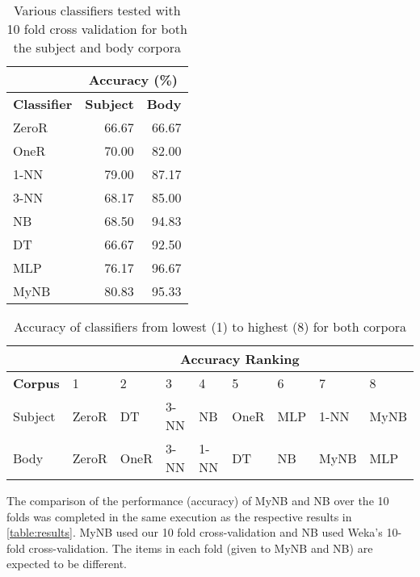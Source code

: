 \documentclass[10pt, a4paper]{article}
\begin{document}
\begin{table}[H]
\centering
\caption{Various classifiers tested with 10 fold cross validation for both the subject and body corpora}
\begin{tabular}{@{}lrr@{}}
\toprule
& \multicolumn{2}{c}{\textbf{Accuracy (\%)}} \\
\midrule
\textbf{Classifier} & \textbf{Subject} & \textbf{Body} \\
\midrule
ZeroR & 66.67 & 66.67 \\
OneR & 70.00 & 82.00 \\
1-NN & 79.00 & 87.17 \\
3-NN & 68.17 & 85.00 \\
NB & 68.50 & 94.83 \\
DT & 66.67 & 92.50 \\
MLP & 76.17 & 96.67 \\
MyNB & 80.83 & 95.33 \\
\bottomrule
\end{tabular}
\label{table:results}
\end{table}

\begin{table}[H]
\centering
\caption{Accuracy of classifiers from lowest (1) to highest (8) for both corpora}
\begin{tabular}{@{} l llllllll @{}}
\toprule
& \multicolumn{8}{c}{\textbf{Accuracy Ranking}} \\
\midrule
\textbf{Corpus} & 1 & 2 & 3 & 4 & 5 & 6 & 7 & 8 \\
\midrule
Subject & ZeroR & DT & 3-NN & NB & OneR & MLP & 1-NN & MyNB\\
Body & ZeroR & OneR & 3-NN & 1-NN & DT & NB & MyNB & MLP\\
\bottomrule
\end{tabular}
\label{table:accuracyofclassifiers}
\end{table}

The comparison of the performance (accuracy) of MyNB and NB over the 10 folds was completed in the same execution as the respective results in \autoref{table:results}. MyNB used our 10 fold cross-validation and NB used Weka's 10-fold cross-validation. The items in each fold (given to MyNB and NB) are expected to be different. 
\end{document}
